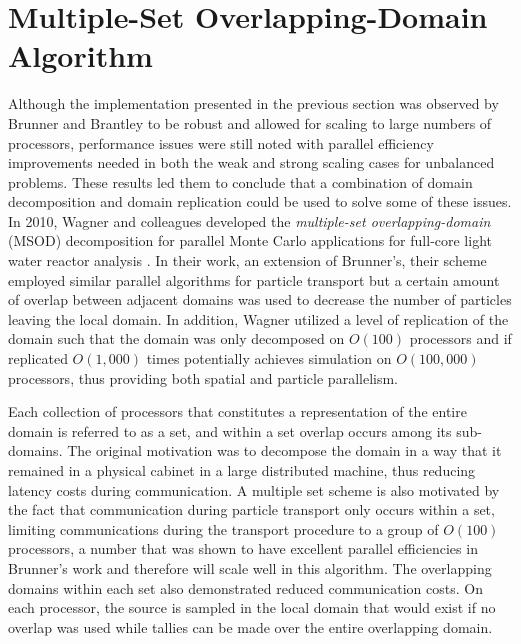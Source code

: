 \clearpage

\section{Multiple-Set Overlapping-Domain Algorithm\ }
\label{subsec:msod}
Although the implementation presented in the previous section was
observed by Brunner and Brantley to be robust and allowed for scaling
to large numbers of processors, performance issues were still noted
with parallel efficiency improvements needed in both the weak and
strong scaling cases for unbalanced problems. These results led them
to conclude that a combination of domain decomposition and domain
replication could be used to solve some of these issues. In 2010,
Wagner and colleagues developed the \textit{multiple-set
  overlapping-domain} (MSOD) decomposition for parallel Monte Carlo
applications for full-core light water reactor analysis
\citep{wagner_hybrid_2010}. In their work, an extension of Brunner's,
their scheme employed similar parallel algorithms for particle
transport but a certain amount of overlap between adjacent domains was
used to decrease the number of particles leaving the local domain. In
addition, Wagner utilized a level of replication of the domain such
that the domain was only decomposed on $O(100)$ processors and if
replicated $O(1,000)$ times potentially achieves simulation on
$O(100,000)$ processors, thus providing both spatial and particle
parallelism. 

Each collection of processors that constitutes a representation of the
entire domain is referred to as a set, and within a set overlap occurs
among its sub-domains. The original motivation was to decompose the
domain in a way that it remained in a physical cabinet in a large
distributed machine, thus reducing latency costs during
communication. A multiple set scheme is also motivated by the fact
that communication during particle transport only occurs within a set,
limiting communications during the transport procedure to a group of
$O(100)$ processors, a number that was shown to have excellent
parallel efficiencies in Brunner's work and therefore will scale well
in this algorithm. The overlapping domains within each set also
demonstrated reduced communication costs. On each processor, the
source is sampled in the local domain that would exist if no overlap
was used while tallies can be made over the entire overlapping domain.

